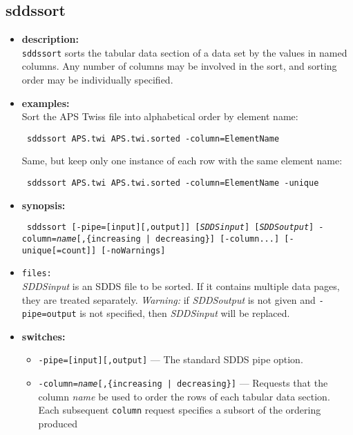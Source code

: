\begin{latexonly}
\newpage
\end{latexonly}
\subsection{sddssort}
\label{sddssort}

\begin{itemize}
\item {\bf description:} \hspace*{1mm}\\
\verb|sddssort| sorts the tabular data section of a data set by the values in named columns.
Any number of columns may be involved in the sort, and sorting order may be individually specified.
\item {\bf examples:} \\
Sort the APS Twiss file into alphabetical order by element name:
\begin{flushleft}{\tt
sddssort APS.twi APS.twi.sorted -column=ElementName
}\end{flushleft}
Same, but keep only one instance of each row with the same element name:
\begin{flushleft}{\tt
sddssort APS.twi APS.twi.sorted -column=ElementName -unique
}\end{flushleft}
\item {\bf synopsis:} \\
\begin{flushleft}{\tt
sddssort [-pipe=[input][,output]] [{\em SDDSinput}] [{\em SDDSoutput}] 
-column={\em name}[,\{increasing | decreasing\}] [-column...]
[-unique[=count]] [-noWarnings]
}\end{flushleft}
\item {\tt files:}\\
{\em SDDSinput} is an SDDS file to be sorted.  If it contains multiple data pages, they
are treated separately.  {\em Warning: } if {\em SDDSoutput} is not given and {\tt -pipe=output}  is not
specified, then {\em SDDSinput} will be replaced.
\item {\bf switches:}
    \begin{itemize}
    \item {\tt -pipe=[input][,output]} --- The standard SDDS pipe option.
    \item {\tt -column={\em name}[,\{increasing | decreasing\}]} --- Requests that the column 
        {\em name} be used to order the rows of each tabular
        data section.  Each subsequent \verb|column| request specifies a subsort of the ordering produced

\end{itemize}
\end{itemize}
